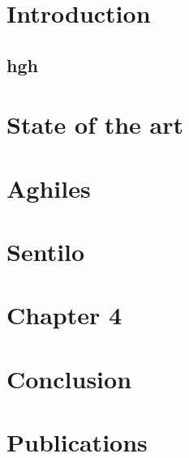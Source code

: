 \documentclass[a4paper, 12pt, twoside,openright]{report}
\begin{document}

\firstpage

\preface




\body
	\chapter{Introduction}
	\minitoc
		\section*{hgh}
		

	\chapter{State of the art \cite{bregell_hardware_2015}}
	\minitoc
		
		
		
		
		

	\chapter{Aghiles \cite{bregell_hardware_2015}}
	\minitoc
		
		
		
		
		
		

	\chapter{Sentilo \cite{_contiki_2016a}}
	\minitoc
		
		
		
		
		
		

	\chapter{Chapter 4}
	\minitoc
		
		
		
		
		
		
		
	\chapter{Conclusion}
%		
	
	\chapter{Publications}
		
\end{document}
